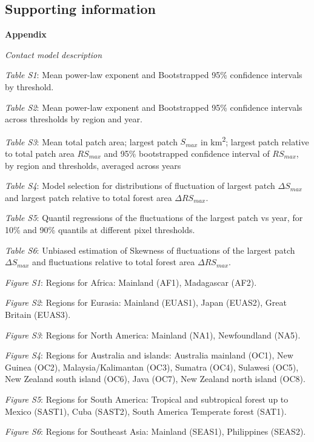 \documentclass[]{article}
\begin{document}
\normalsize

\newpage

\subsection{Supporting information}\label{supporting-information}

\textbf{Appendix}

\emph{Contact model description}

\emph{Table S1}: Mean power-law exponent and Bootstrapped 95\%
confidence intervals by threshold.

\emph{Table S2}: Mean power-law exponent and Bootstrapped 95\%
confidence intervals across thresholds by region and year.

\emph{Table S3}: Mean total patch area; largest patch \(S_{max}\) in
km\textsuperscript{2}; largest patch relative to total patch area
\(RS_{max}\) and 95\% bootstrapped confidence interval of \(RS_{max}\),
by region and thresholds, averaged across years

\emph{Table S4}: Model selection for distributions of fluctuation of
largest patch \(\Delta S_{max}\) and largest patch relative to total
forest area \(\Delta RS_{max}\).

\emph{Table S5}: Quantil regressions of the fluctuations of the largest
patch vs year, for 10\% and 90\% quantils at different pixel thresholds.

\emph{Table S6}: Unbiased estimation of Skewness of fluctuations of the
largest patch \(\Delta S_{max}\) and fluctuations relative to total
forest area \(\Delta RS_{max}\).

\emph{Figure S1}: Regions for Africa: Mainland (AF1), Madagascar (AF2).

\emph{Figure S2}: Regions for Eurasia: Mainland (EUAS1), Japan (EUAS2),
Great Britain (EUAS3).

\emph{Figure S3}: Regions for North America: Mainland (NA1),
Newfoundland (NA5).

\emph{Figure S4}: Regions for Australia and islands: Australia mainland
(OC1), New Guinea (OC2), Malaysia/Kalimantan (OC3), Sumatra (OC4),
Sulawesi (OC5), New Zealand south island (OC6), Java (OC7), New Zealand
north island (OC8).

\emph{Figure S5}: Regions for South America: Tropical and subtropical
forest up to Mexico (SAST1), Cuba (SAST2), South America Temperate
forest (SAT1).

\emph{Figure S6}: Regions for Southeast Asia: Mainland (SEAS1),
Philippines (SEAS2).
\end{document}
